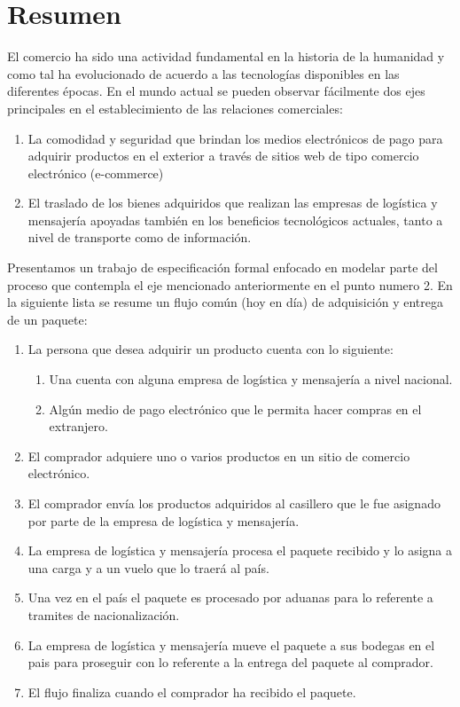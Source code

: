 \documentclass[12pt,a4paper]{article}
\begin{document}
\section{Resumen}
El comercio ha sido una actividad fundamental en la historia de la humanidad y como tal ha evolucionado de acuerdo a las tecnologías disponibles en las diferentes épocas. 
En el mundo actual se pueden observar fácilmente dos ejes principales en el establecimiento de las relaciones comerciales: 
\begin{enumerate}
\item La comodidad y seguridad que brindan los medios electrónicos de pago para adquirir productos en el exterior a través de sitios web de tipo comercio electrónico (e-commerce)
\item El traslado de los bienes adquiridos que realizan las empresas de logística y mensajería apoyadas también en los beneficios tecnológicos actuales, tanto a nivel de transporte como de información.
\end{enumerate}
Presentamos un trabajo de especificación formal enfocado en modelar parte del proceso que contempla el eje mencionado anteriormente en el punto numero 2. En la siguiente lista se resume un flujo común (hoy en día) de adquisición y entrega de un paquete:
\begin{enumerate}
\item La persona que desea adquirir un producto cuenta con lo siguiente:
\begin{enumerate}
\item Una cuenta con alguna empresa de logística y mensajería a nivel nacional.
\item Algún medio de pago electrónico que le permita hacer compras en el extranjero.
\end{enumerate}
\item El comprador adquiere uno o varios productos en un sitio de comercio electrónico.
\item El comprador envía los productos adquiridos al casillero que le fue asignado por parte de la empresa de logística y mensajería.
\item La empresa de logística y mensajería procesa el paquete recibido y lo asigna a una carga y a un vuelo que lo traerá al país.
\item Una vez en el país el paquete es procesado por aduanas para lo referente a tramites de nacionalización.
\item La empresa de logística y mensajería mueve el paquete a sus bodegas en el pais para proseguir con lo referente a la entrega del paquete al comprador.
\item El flujo finaliza cuando el comprador ha recibido el paquete.
\end{enumerate}
\end{document}
